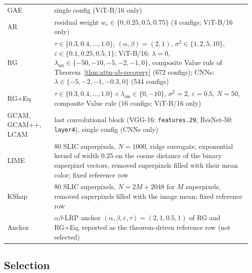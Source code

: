 \documentclass[twoside]{article}
\newcommand{\1}{\mathbf{1}}
\begin{document}
\begin{table}[H]
\begin{tabular}{@{}l p{}@{}}
        GAE & single config \quad (ViT-B/16 only) \\
        AR & residual weight $w_r \in \{0, 0.25, 0.5, 0.75\}$ \quad (4 configs; ViT-B/16 only) \\
        RG & $\tau \in \{0.3, 0.4, \ldots, 1.0\}$, $(\alpha,\beta){=}(2,1)$, $\sigma^2 \in \{1, 2, 5,
            10\}$, $\varepsilon \in \{0.1, 0.25, 0.5, 1\}$; ViT-B/16: $\lambda{=}0$, $\lambda_{\mathrm{sm}} \in
            \{-50, -10, -5, -2, -1, 0\}$, composite Value rule of Theorem~\ref{thm:attn-ab-recovery} (672
        configs); CNNs: $\lambda \in \{-5, -2, -1, -0.3, 0\}$ (544 configs) \\
        RG+Eq & $\tau \in \{0.3, 0.4, \ldots, 1.0\} \times \lambda_{\mathrm{sm}} \in \{0, -10\}$,
        $\sigma^2{=}2$, $\varepsilon{=}0.5$, $N{=}50$, composite Value rule \quad (16 configs; ViT-B/16
        only) \\
        GCAM, GCAM++, LCAM & last convolutional block (VGG-16: \texttt{features.29}, ResNet-50:
        \texttt{layer4}), single config \quad (CNNs only) \\
        LIME & 80 SLIC superpixels, $N{=}1000$, ridge surrogate, exponential kernel of width $0.25$ on the
        cosine distance of the binary superpixel vectors, removed superpixels filled with their mean color;
        fixed reference row \\
        KShap & 80 SLIC superpixels, $N{=}2M{+}2048$ for $M$ superpixels, removed superpixels filled with
        the image mean; fixed reference row \\
        Anchor & $\alpha\beta$-\ac{LRP} anchor $(\alpha,\beta,\varepsilon,\tau){=}(2,1,0.5,1)$ of \ac{RG}
        and \ac{RG}+Eq, reported as the theorem-driven reference row (not selected) \\
        \bottomrule
    \end{tabular}
\end{table}

\subsection{Selection}\label{app:selection}
\end{document}

